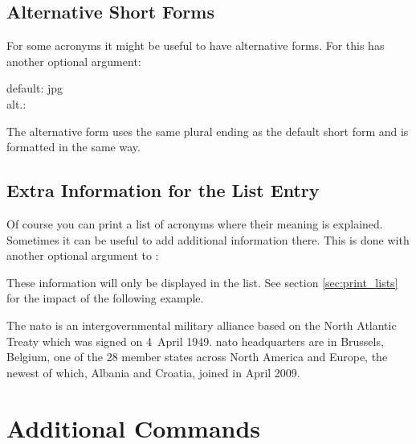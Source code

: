 \documentclass[DIV10,toc=index,toc=bib]{cnpkgdoc}
\begin{document}
\subsection{Alternative Short Forms}
For some acronyms it might be useful to have alternative forms. For this
 has another optional argument:
\begin{beschreibung}
\end{beschreibung}
\begin{beispiel}
 default: \acs{jpg} \\
 alt.: 
\end{beispiel}
The alternative form uses the same plural ending as the default short form and
is formatted in the same way.

\subsection{Extra Information for the List Entry}
Of course you can print a list of acronyms where their meaning is explained.
Sometimes it can be useful to add additional information there. This is done with
another optional argument to :
\begin{beschreibung}
\end{beschreibung}
These information will only be displayed in the list. See section \ref{sec:print_lists}
for the impact of the following example.

\begin{beispiel}
 The \ac{nato} is an intergovernmental military alliance based on the
 North Atlantic Treaty which was signed on 4~April 1949. \ac{nato}
 headquarters are in Brussels, Belgium, one of the 28 member states
 across North America and Europe, the newest of which, Albania and
 Croatia, joined in April 2009.
\end{beispiel}

\section{Additional Commands}
\end{document}
